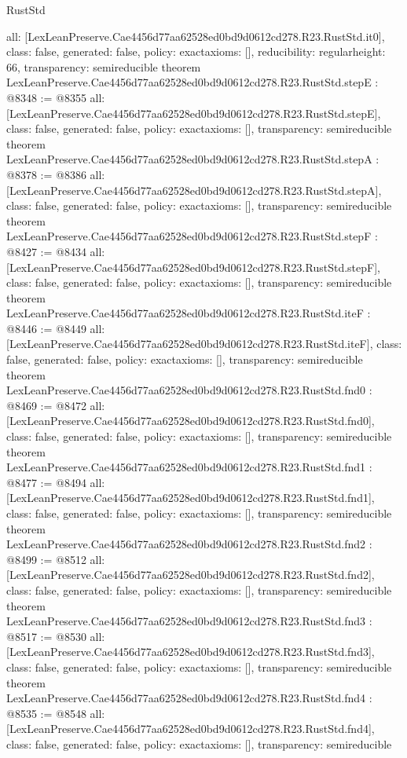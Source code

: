 \begin{lexlean}{RustStd}
\begin{coremodule}
{  all: [LexLeanPreserve.Cae4456d77aa62528ed0bd9d0612cd278.R23.RustStd.it0],
  class: false,
  generated: false,
  policy: exact{axioms: []},
  reducibility: regular{height: 66},
  transparency: semireducible
}
theorem LexLeanPreserve.Cae4456d77aa62528ed0bd9d0612cd278.R23.RustStd.stepE : @8348 := @8355 {
  all: [LexLeanPreserve.Cae4456d77aa62528ed0bd9d0612cd278.R23.RustStd.stepE],
  class: false,
  generated: false,
  policy: exact{axioms: []},
  transparency: semireducible
}
theorem LexLeanPreserve.Cae4456d77aa62528ed0bd9d0612cd278.R23.RustStd.stepA : @8378 := @8386 {
  all: [LexLeanPreserve.Cae4456d77aa62528ed0bd9d0612cd278.R23.RustStd.stepA],
  class: false,
  generated: false,
  policy: exact{axioms: []},
  transparency: semireducible
}
theorem LexLeanPreserve.Cae4456d77aa62528ed0bd9d0612cd278.R23.RustStd.stepF : @8427 := @8434 {
  all: [LexLeanPreserve.Cae4456d77aa62528ed0bd9d0612cd278.R23.RustStd.stepF],
  class: false,
  generated: false,
  policy: exact{axioms: []},
  transparency: semireducible
}
theorem LexLeanPreserve.Cae4456d77aa62528ed0bd9d0612cd278.R23.RustStd.iteF : @8446 := @8449 {
  all: [LexLeanPreserve.Cae4456d77aa62528ed0bd9d0612cd278.R23.RustStd.iteF],
  class: false,
  generated: false,
  policy: exact{axioms: []},
  transparency: semireducible
}
theorem LexLeanPreserve.Cae4456d77aa62528ed0bd9d0612cd278.R23.RustStd.fnd0 : @8469 := @8472 {
  all: [LexLeanPreserve.Cae4456d77aa62528ed0bd9d0612cd278.R23.RustStd.fnd0],
  class: false,
  generated: false,
  policy: exact{axioms: []},
  transparency: semireducible
}
theorem LexLeanPreserve.Cae4456d77aa62528ed0bd9d0612cd278.R23.RustStd.fnd1 : @8477 := @8494 {
  all: [LexLeanPreserve.Cae4456d77aa62528ed0bd9d0612cd278.R23.RustStd.fnd1],
  class: false,
  generated: false,
  policy: exact{axioms: []},
  transparency: semireducible
}
theorem LexLeanPreserve.Cae4456d77aa62528ed0bd9d0612cd278.R23.RustStd.fnd2 : @8499 := @8512 {
  all: [LexLeanPreserve.Cae4456d77aa62528ed0bd9d0612cd278.R23.RustStd.fnd2],
  class: false,
  generated: false,
  policy: exact{axioms: []},
  transparency: semireducible
}
theorem LexLeanPreserve.Cae4456d77aa62528ed0bd9d0612cd278.R23.RustStd.fnd3 : @8517 := @8530 {
  all: [LexLeanPreserve.Cae4456d77aa62528ed0bd9d0612cd278.R23.RustStd.fnd3],
  class: false,
  generated: false,
  policy: exact{axioms: []},
  transparency: semireducible
}
theorem LexLeanPreserve.Cae4456d77aa62528ed0bd9d0612cd278.R23.RustStd.fnd4 : @8535 := @8548 {
  all: [LexLeanPreserve.Cae4456d77aa62528ed0bd9d0612cd278.R23.RustStd.fnd4],
  class: false,
  generated: false,
  policy: exact{axioms: []},
  transparency: semireducible
}
\end{coremodule}
\end{lexlean}
